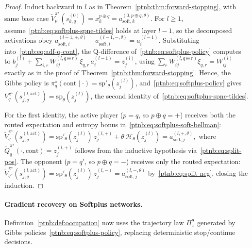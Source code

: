 \begin{proof}
Induct backward in $l$ as in Theorem~\ref{ptnb:thm:forward-stopping}, with
same base case $\tilde V_p^{\pi^\star}(s_{k,q}^{(0)}) = x_k^{p\oplus q} = a_{\mathrm{soft},k}^{(0,
    p\oplus q, \theta)}$. For $l \ge 1$, assume~\eqref{ptnb:eq:softplus-spne-tildes} holds at layer $l-1$,
so the decomposed activations obey $a_{\mathrm{soft},i}^{(l-1, +,\theta)} -
    a_{\mathrm{soft},i}^{(l-1, -,\theta)} = a_i^{(l-1)}$. Substituting into~\eqref{ptnb:eq:adf-q-cont}, the
Q-difference of~\eqref{ptnb:eq:softplus-policy} computes to
$b_j^{(l)} + \sum_{i,r} W_{ij}^{(l, q\oplus r)}\, \xi_{q,r}\, a_i^{(l-1)} = z_j^{(l)}$, using
$\sum_r W_{ij}^{(l, q\oplus r)}\xi_{q,r} = W_{ij}^{(l)}$ exactly as in the proof of
Theorem~\ref{ptnb:thm:forward-stopping}. Hence, the Gibbs policy is $\pi_q^\star(\mathrm{cont}\mid
    \cdot) = \mathrm{sp}'_\theta(z_j^{(l)})$, and~\eqref{ptnb:eq:softplus-policy} gives
$V_q^{\pi^\star}(s_{j,q}^{(l, \mathrm{act})}) = \mathrm{sp}_\theta(z_j^{(l)})$, the second identity
of~\eqref{ptnb:eq:softplus-spne-tildes}.

For the first identity, the active player ($p = q$, so $p \oplus q = +$) receives both
the routed expectation and entropy bonus in~\eqref{ptnb:eq:softplus-soft-bellman}:
\(
    \tilde V_q^{\pi^\star}(s_{j,q}^{(l, \mathrm{act})})
    = \mathrm{sp}'_\theta(z_j^{(l)})\, z_j^{(l, +)} + \theta\, \mathcal{H}_\theta(z_j^{(l)})
    = a_{\mathrm{soft},j}^{(l, +, \theta)},
\)
where $\tilde Q_q^{\pi^\star}(\cdot, \mathrm{cont}) = z_j^{(l, +)}$ follows from the inductive
hypothesis via~\eqref{ptnb:eq:split-pos}. The opponent ($p = q'$, so $p \oplus q = -$) receives
only the routed expectation:
\(
    \tilde V_{q'}^{\pi^\star}(s_{j,q}^{(l, \mathrm{act})})
    = \mathrm{sp}'_\theta(z_j^{(l)})\, z_j^{(l, -)}
    = a_{\mathrm{soft},j}^{(l, -, \theta)}
\)
by~\eqref{ptnb:eq:split-neg}, closing the induction.
\end{proof}

\paragraph{Gradient recovery on Softplus networks.}\label{ptnb:app:softplus-gradient}
Definition~\ref{ptnb:def:occupation} now uses the trajectory law $\Pi_x^\theta$ generated by Gibbs
policies~\eqref{ptnb:eq:softplus-policy}, replacing deterministic stop/continue decisions.

